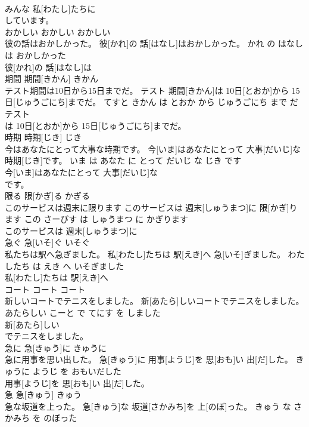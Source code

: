 \documentclass[8pt]{extreport}
\begin{document}
\begin{CJK}{UTF8}{min}
\\	みんな 私[わたし]たちに
\\	しています。		
\\	おかしい	おかしい	おかしい	
\\	彼の話はおかしかった。	彼[かれ]の 話[はなし]はおかしかった。	かれ の はなし は おかしかった	
\\	彼[かれ]の 話[はなし]は
\\	期間	期間[きかん]	きかん	
\\	テスト期間は10日から15日までだ。	テスト 期間[きかん]は 10日[とおか]から 15日[じゅうごにち]までだ。	てすと きかん は とおか から じゅうごにち まで だ	
\\	テスト
\\	は 10日[とおか]から 15日[じゅうごにち]までだ。		
\\	時期	時期[じき]	じき	
\\	今はあなたにとって大事な時期です。	今[いま]はあなたにとって 大事[だいじ]な 時期[じき]です。	いま は あなた に とって だいじ な じき です	
\\	今[いま]はあなたにとって 大事[だいじ]な
\\	です。		
\\	限る	限[かぎ]る	かぎる	
\\	このサービスは週末に限ります	このサービスは 週末[しゅうまつ]に 限[かぎ]ります	この さーびす は しゅうまつ に かぎります	
\\	このサービスは 週末[しゅうまつ]に
\\	急ぐ	急[いそ]ぐ	いそぐ	
\\	私たちは駅へ急ぎました。	私[わたし]たちは 駅[えき]へ 急[いそ]ぎました。	わたしたち は えき へ いそぎました	
\\	私[わたし]たちは 駅[えき]へ
\\	コート	コート	コート	
\\	新しいコートでテニスをしました。	新[あたら]しいコートでテニスをしました。	あたらしい こーと で てにす を しました	
\\	新[あたら]しい
\\	でテニスをしました。		
\\	急に	急[きゅう]に	きゅうに	
\\	急に用事を思い出した。	急[きゅう]に 用事[ようじ]を 思[おも]い 出[だ]した。	きゅうに ようじ を おもいだした	
\\	用事[ようじ]を 思[おも]い 出[だ]した。		
\\	急	急[きゅう]	きゅう	
\\	急な坂道を上った。	急[きゅう]な 坂道[さかみち]を 上[のぼ]った。	きゅう な さかみち を のぼった	

\end{CJK}
\end{document}
